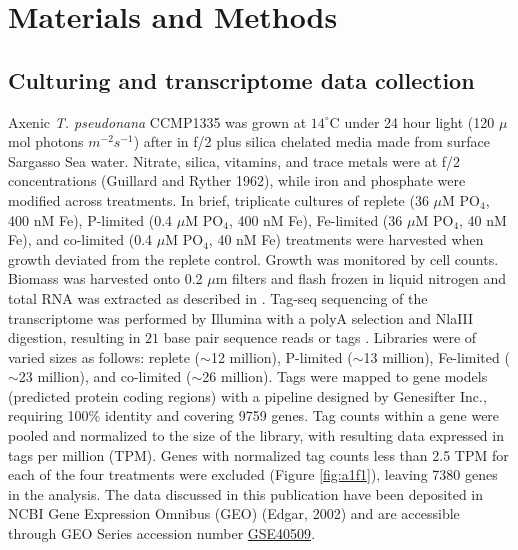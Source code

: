 \section{Materials and Methods}
\subsection{Culturing and transcriptome data collection} 
Axenic \textit{T. pseudonana} CCMP1335 was grown at $14^{\circ}$C under 24 hour light (120 $\mu$mol photons $m^{-2} s^{-1}$) after \citet{Dyhrman2012} in f/2 plus silica chelated media made from surface Sargasso Sea water. Nitrate, silica, vitamins, and trace metals were at f/2 concentrations (Guillard and Ryther 1962), while iron and phosphate were modified across treatments. In brief, triplicate cultures of replete (36 $\mu$M PO$_{4}$, 400 nM Fe), P-limited (0.4 $\mu$M PO$_{4}$, 400 nM Fe), Fe-limited (36 $\mu$M PO$_{4}$, 40 nM Fe), and co-limited (0.4 $\mu$M PO$_{4}$, 40 nM Fe) treatments were harvested when growth deviated from the replete control. Growth was monitored by cell counts. Biomass was harvested onto 0.2 $\mu$m filters and flash frozen in liquid nitrogen and total RNA was extracted as described in \citep{Dyhrman2012}. Tag-seq sequencing of the transcriptome was performed by Illumina with a polyA selection and NlaIII digestion, resulting in $21$ base pair sequence reads or tags \citep{Dyhrman2012}. Libraries were of varied sizes as follows: replete ($\sim$12 million), P-limited ($\sim$13 million), Fe-limited ($\sim$23 million), and co-limited ($\sim$26 million). Tags were mapped to gene models (predicted protein coding regions) with a pipeline designed by Genesifter Inc., requiring 100\% identity and covering 9759 genes. Tag counts within a gene were pooled and normalized to the size of the library, with resulting data expressed in tags per million (TPM). Genes with normalized tag counts less than 2.5 TPM for each of the four treatments were excluded (Figure \ref{fig:a1f1}), leaving 7380 genes in the analysis. The data discussed in this publication have been deposited in NCBI Gene Expression Omnibus (GEO) (Edgar, 2002) and are accessible through GEO Series accession number \href{http://www.ncbi.nlm.nih.gov/geo/query/acc.cgi?acc=GSE40509}{GSE40509}.  
